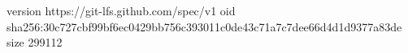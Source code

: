 version https://git-lfs.github.com/spec/v1
oid sha256:30c727cbf99bf6ec0429bb756c393011c0de43c71a7c7dee66d4d1d9377a83de
size 299112
